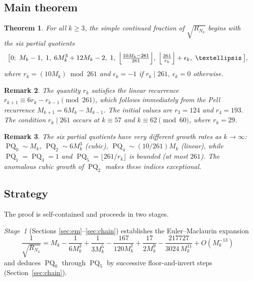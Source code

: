 \documentclass[10pt,a4paper]{amsart}
\newtheorem{theorem}{Theorem}[section]
\newtheorem{remark}[theorem]{Remark}
\newcommand{\floor}[1]{\lfloor #1 \rfloor}
\DeclareMathOperator{\PQ}{PQ}
\begin{document}
\subsection{Main theorem}


\begin{theorem}\label{thm:main}
  For all $k \geq 3$, the simple continued fraction of $\sqrt{R_{N_k}}$
  begins with the six partial quotients
  \begin{equation}\label{eq:main-cf}
    \bigl[0;\; M_k-1,\; 1,\; 6M_k^3+12M_k-2,\; 1,\;
    \Bigl\lfloor\tfrac{10M_k-261}{261}\Bigr\rfloor,\;
    \Bigl\lfloor\tfrac{261}{r_k}\Bigr\rfloor + \epsilon_k,\;
    \ldots\,\bigr],
  \end{equation}
  where $r_k = (10M_k)\bmod 261$ and $\epsilon_k = -1$ if
  $r_k \mid 261$, $\epsilon_k = 0$ otherwise.
\end{theorem}


\begin{remark}
  The quantity $r_k$ satisfies the linear recurrence
  $r_{k+1} \equiv 6r_k - r_{k-1} \pmod{261}$, which follows immediately
  from the Pell recurrence $M_{k+1} = 6M_k - M_{k-1}$.  The initial
  values are $r_3 = 124$ and $r_4 = 193$.  The condition $r_k \mid 261$
  occurs at $k \equiv 57$ and $k \equiv 62 \pmod{60}$, where $r_k = 29$.
\end{remark}

\begin{remark}\label{rem:growth}
  The six partial quotients have very different growth rates as $k \to \infty$:
  $\PQ_0 \sim M_k$, $\PQ_2 \sim 6M_k^3$ (cubic), $\PQ_4 \sim (10/261)M_k$
  (linear), while $\PQ_1 = \PQ_3 = 1$ and $\PQ_5 = \floor{261/r_k}$
  is bounded (at most $261$).  The anomalous cubic growth of $\PQ_2$
  makes these indices exceptional.
\end{remark}

\subsection{Strategy}

The proof is self-contained and proceeds in two stages.

\textit{Stage~1} (Sections \ref{sec:em}--\ref{sec:chain}) establishes
the Euler--Maclaurin expansion
\begin{equation}\label{eq:key-expansion}
  \frac{1}{\sqrt{R_{N_k}}}
  = M_k - \frac{1}{6M_k^3} + \frac{1}{3M_k^5} - \frac{167}{120M_k^7}
    + \frac{17}{2M_k^9} - \frac{217727}{3024\,M_k^{11}} + O(M_k^{-13})
\end{equation}
and deduces $\PQ_0$ through $\PQ_5$ by successive floor-and-invert steps
(Section~\ref{sec:chain}).
\end{document}

